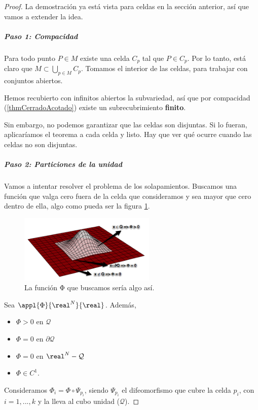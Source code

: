 \begin{proof} La demostración ya está vista para celdas en la sección anterior, así que vamos a extender la idea.



\subparagraph{Paso 1: Compacidad}
Para todo punto $P\in M$ existe una celda $C_p$ tal que $P \in C_p$. Por lo tanto, está claro que $M\subset \bigcup_{p\in M} C_p$. Tomamos el interior de las celdas, para trabajar con conjuntos abiertos.

Hemos recubierto con infinitos abiertos la subvariedad, así que por compacidad (\ref{thmCerradoAcotado}) existe un subrecubrimiento \textbf{finito}.

Sin embargo, no podemos garantizar que las celdas son disjuntas. Si lo fueran, aplicaríamos el teorema a cada celda y listo. Hay que ver qué ocurre cuando las celdas no son disjuntas.

\subparagraph{Paso 2: Particiones de la unidad}

Vamos a intentar resolver el problema de los solapamientos. Buscamos una función que valga cero fuera de la celda que consideramos y sea mayor que cero dentro de ella, algo como pueda ser la figura \ref{imgStokesPhi}.

\begin{figure}
  \begin{center}
    \includegraphics[width=0.58\textwidth]{imgs/TeoremaStokes-PartUnidad.png}
  \end{center}
  \caption{La función Φ que buscamos sería algo así.}
  \label{imgStokesPhi}
\end{figure}
Sea $\appl{\Phi}{\real^N}{\real}$. Además, 
\begin{itemize}
\item $\Phi>0$ en $\mathcal{Q}$
\item $\Phi = 0$ en $\partial  \mathcal{Q}$
\item $\Phi = 0$ en $\real^N-\mathcal{Q}$
\item $\Phi\in C^1$.
\end{itemize}
Consideramos $\Phi_i = \Phi\circ\Psi_{p_i}$, siendo $\Psi_{p_i}$ el difeomorfismo que cubre la celda $p_i$, con $i=1,...,k$ y la lleva al cubo unidad ($\mathcal{Q}$).


\end{proof}

